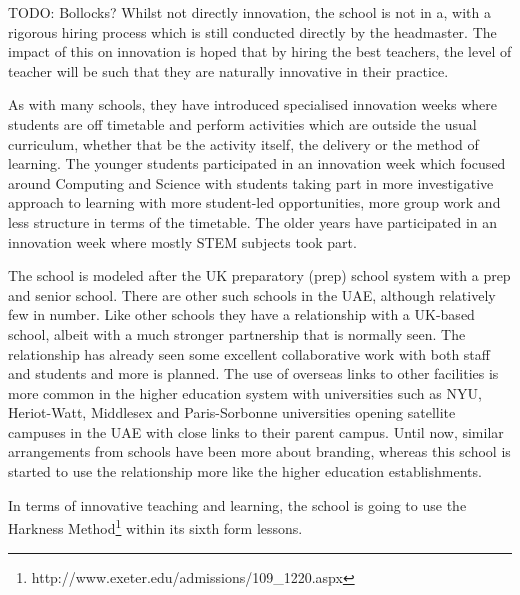 TODO: Bollocks?
Whilst not directly innovation, the school is not in a, with a rigorous hiring process which is still conducted directly by the headmaster. The impact of this on innovation is hoped that by hiring the best teachers, the level of teacher will be such that they are naturally innovative in their practice.

As with many schools, they have introduced specialised innovation weeks where students are off timetable and perform activities which are outside the usual curriculum, whether that be the activity itself, the delivery or the method of learning. The younger students participated in an innovation week which focused around Computing and Science with students taking part in more investigative approach to learning with more student-led opportunities, more group work and less structure in terms of the timetable. The older years have participated in an innovation week where mostly STEM subjects took part.

The school is modeled after the UK preparatory (prep) school system with a prep and senior school. There are other such schools in the UAE, although relatively few in number. Like other schools they have a relationship with a UK-based school, albeit with a much stronger partnership that is normally seen. The relationship has already seen some excellent collaborative work with both staff and students and  more is planned. The use of overseas links to other facilities is more common in the higher education system with universities such as NYU, Heriot-Watt, Middlesex and Paris-Sorbonne universities opening satellite campuses in the UAE with close links to their parent campus. Until now, similar arrangements from schools have been more about branding, whereas this school is started to use the relationship more like the higher education establishments.

In terms of innovative teaching and learning, the school is going to use the Harkness Method\footnote{http://www.exeter.edu/admissions/109_1220.aspx} within its sixth form lessons. 

